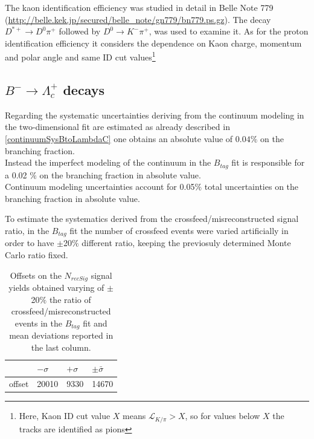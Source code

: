  \vspace{0.2 cm}
 \noindent  The kaon identification efficiency was studied in detail in Belle Note 779 \cite{KIDeff} (\url{http://belle.kek.jp/secured/belle_note/gn779/bn779.ps.gz}). The decay $D^{*+} \rightarrow D^0 \pi^+$ followed by $D^0 \rightarrow K^- \pi^+$, was used to examine it. As for the proton identification efficiency it considers the dependence on Kaon charge, momentum and polar angle and same ID cut values\footnote{Here, Kaon ID cut value $X$ means $  \mathcal{L}_{K/\pi} > X$, so for values below $X$ the tracks are identified as pions} 

\subsection{$B^- \rightarrow \Lambda_c^+$ decays}
Regarding the systematic uncertainties deriving from the continuum modeling in the two-dimensional fit are estimated as 
already described in \ref{continuumSysBtoLambdaC} one obtains an absolute value of $0.04\%$ on the branching fraction.\\
Instead the imperfect modeling of the continuum in the $B_{tag}  $ fit is responsible for a 0.02 $\%$ on the branching fraction in absolute value.\\
Continuum modeling uncertainties account for 0.05$\%$ total uncertainties on the branching fraction in absolute value.
\vspace{1 cm}

To estimate the systematics derived from the crossfeed/misreconstructed signal ratio, in the $B_{tag}$ fit the number of crossfeed events 
were varied artificially in order to have $\pm$20$\%$ different ratio, keeping the previosuly determined Monte Carlo ratio fixed.

\vspace{0.25 cm}
\begin{table}[H]
\begin{tabular}{ |p{2.5cm}||p{2cm}| p{2cm}|  p{2cm}|}
\hline
       &  $- \sigma$ &  $+ \sigma$ & $ \pm \bar{\sigma}$\\
 \hline
 offset    &  20010 &  9330 & 14670 \\
 \hline
\end{tabular}
\caption{Offsets on the $N_{recSig}$  signal yields obtained varying of $\pm$20$\%$ the 
 ratio of crossfeed/misreconstructed events in the $B_{tag}$ fit and mean deviations reported in the last column.}
\end{table}

